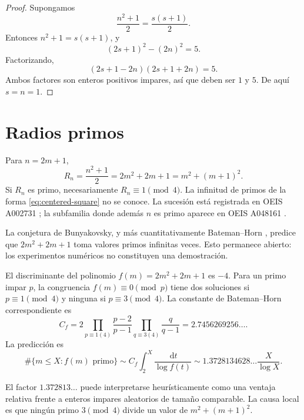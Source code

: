 \documentclass[11pt,a4paper,openany]{report}
\newcommand{\dd}{\,\mathrm{d}}
\begin{document}
\begin{proof}
Supongamos
\[
 \frac{n^2+1}{2}=\frac{s(s+1)}2.
\]
Entonces \(n^2+1=s(s+1)\), y
\[
 (2s+1)^2-(2n)^2=5.
\]
Factorizando,
\[
 (2s+1-2n)(2s+1+2n)=5.
\]
Ambos factores son enteros positivos impares, así que deben ser \(1\) y \(5\). De aquí \(s=n=1\).
\end{proof}

\section{Radios primos}

Para \(n=2m+1\),
\begin{equation}
 R_n=\frac{n^2+1}{2}=2m^2+2m+1=m^2+(m+1)^2.
 \label{eq:centered-square}
\end{equation}
Si \(R_n\) es primo, necesariamente \(R_n\equiv1\pmod4\). La infinitud de primos de la forma \eqref{eq:centered-square} no se conoce. La sucesión está registrada en OEIS A002731 \cite{OEISA002731}; la subfamilia donde además \(n\) es primo aparece en OEIS A048161 \cite{OEISA048161}.

\begin{conjecturalbox}
La conjetura de Bunyakovsky, y más cuantitativamente Bateman--Horn \cite{BatemanHorn,AletheiaFukshanskyGarcia}, predice que \(2m^2+2m+1\) toma valores primos infinitas veces. Esto permanece abierto: los experimentos numéricos no constituyen una demostración.
\end{conjecturalbox}

El discriminante del polinomio \(f(m)=2m^2+2m+1\) es \(-4\). Para un primo impar \(p\), la congruencia \(f(m)\equiv0\pmod p\) tiene dos soluciones si \(p\equiv1\pmod4\) y ninguna si \(p\equiv3\pmod4\). La constante de Bateman--Horn correspondiente es
\begin{equation}
 C_f=2
 \prod_{p\equiv1(4)}\frac{p-2}{p-1}
 \prod_{q\equiv3(4)}\frac{q}{q-1}
 =2.7456269256\ldots.
 \label{eq:Cf}
\end{equation}
La predicción es
\[
 \#\{m\le X:f(m)\text{ primo}\}
 \sim C_f\int_2^X\frac{\dd t}{\log f(t)}
 \sim 1.3728134628\ldots\frac{X}{\log X}.
\]

\begin{remark}
El factor \(1.372813\ldots\) puede interpretarse heurísticamente como una ventaja relativa frente a enteros impares aleatorios de tamaño comparable. La causa local es que ningún primo \(3\pmod4\) divide un valor de \(m^2+(m+1)^2\).
\end{remark}
\end{document}
